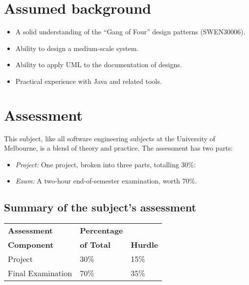 \section*{Assumed background}

\begin{itemize}

 \item A solid understanding of the ``Gang of Four'' design patterns (SWEN30006).

 \item Ability to design a medium-scale system.

 \item Ability to apply UML to the documentation of designs.

 \item Practical experience with Java and related tools.

\end{itemize}

\section*{Assessment}

This subject, like all software engineering subjects at the University of Melbourne, is a blend of theory and practice. The assessment has two parts:

\begin{itemize}

 \item {\em Project:} One project, broken into three parts, totalling 30\%:

 \item {\em Exam:} A two-hour end-of-semester examination, worth 70\%.

\end{itemize}

\subsection*{Summary of the subject's assessment}

\vspace{2ex}
\begin{center}
\begin{tabular}{lll}
 \textbf{Assessment} & \textbf{Percentage} & \\
 \textbf{Component}  & \textbf{of Total}   & \textbf{Hurdle} \\
 \hline\hline
 Project                       & 30\%                        & 15\%\\
 Final Examination               & 70\%                        & 35\% \\
\hline
\end{tabular}
\end{center}
\vspace{2ex}

